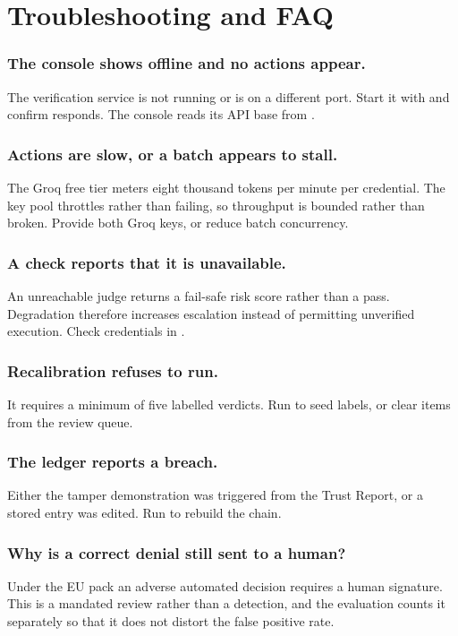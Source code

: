 \documentclass[10pt]{article}
\begin{document}
\section{Troubleshooting and FAQ}

\subsubsection{The console shows offline and no actions appear.}
The verification service is not running or is on a different port. Start it with
 and confirm  responds. The console
reads its API base from .

\subsubsection{Actions are slow, or a batch appears to stall.}
The Groq free tier meters eight thousand tokens per minute per credential. The key pool
throttles rather than failing, so throughput is bounded rather than broken. Provide both
Groq keys, or reduce batch concurrency.

\subsubsection{A check reports that it is unavailable.}
An unreachable judge returns a fail-safe risk score rather than a pass. Degradation
therefore increases escalation instead of permitting unverified execution. Check
credentials in .

\subsubsection{Recalibration refuses to run.}
It requires a minimum of five labelled verdicts. Run  to seed labels, or
clear items from the review queue.

\subsubsection{The ledger reports a breach.}
Either the tamper demonstration was triggered from the Trust Report, or a stored entry was
edited. Run  to rebuild the chain.

\subsubsection{Why is a correct denial still sent to a human?}
Under the EU pack an adverse automated decision requires a human signature. This is a
mandated review rather than a detection, and the evaluation counts it separately so that
it does not distort the false positive rate.
\end{document}
